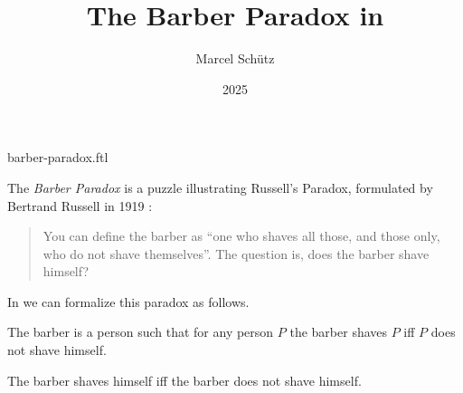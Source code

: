 \documentclass{stex}
\title{The Barber Paradox in \Naproche}
\author{Marcel Schütz}
\date{2025}
\begin{document}
\begin{smodule}{barber-paradox.ftl}
\maketitle


\noindent The \emph{Barber Paradox} is a puzzle illustrating Russell's
Paradox, formulated by Bertrand Russell in 1919 \cite[p. 355]{Russell1919}:

\begin{quotation}
  \noindent You can define the barber as ``one who shaves all those, and 
  those only, who do not shave themselves''.
  The question is, does the barber shave himself?
\end{quotation}

\noindent In \Naproche we can formalize this paradox as follows.

\begin{forthel}
  \begin{signature*}
    The barber is a person such that for any person $P$ the barber shaves $P$ iff $P$ does not shave himself.
  \end{signature*}
  
  \begin{theorem*}[title=Barber Paradox,id=barber_paradox]
    The barber shaves himself iff the barber does not shave himself.
  \end{theorem*}
\end{forthel}

\printbibliography
{}
\end{smodule}
\end{document}
